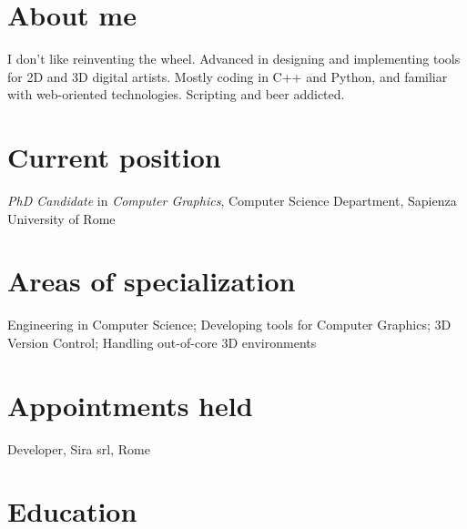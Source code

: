 \documentclass[11pt, a4paper]{article} %
\newcommand{\years}[1]{\marginnote{\scriptsize #1}} %
\begin{document}
\section*{About me}

I don't like reinventing the wheel. Advanced in designing and implementing tools for 2D and 3D digital artists. Mostly coding in C++ and Python, and familiar with web-oriented technologies.
Scripting and beer addicted.


\section*{Current position}

\emph{PhD Candidate} in \emph{Computer Graphics}, Computer Science Department, Sapienza University of Rome %


\section*{Areas of specialization}

Engineering in Computer Science; Developing tools for Computer Graphics; 3D Version Control; Handling out-of-core 3D environments %


\section*{Appointments held}

\years{2012} Developer, Sira srl, Rome\\


\section*{Education}
\end{document}
